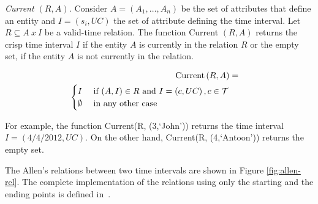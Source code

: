 \begin{definition}
\label{def:current-in-relation}
\emph{Current $\left(R, A \right)$.}
Consider $A=\left(A_1, \ldots, A_n \right)$ be the set of attributes that define an entity and $I = \left(s_i,UC \right)$ the set of attribute defining the time interval. Let $R \subseteq A\  x\  I$ be a valid-time relation. The function Current $\left(R, A \right)$ returns the crisp time interval $I$ if the entity $A$ is currently in the relation $R$ or the empty set, if the entity $A$ is not currently in the relation.


\begin{align}
\label{eq:current-in-relation}
\mbox{Current} \left(R, A \right) &=& \\ 
\begin{cases}
\nonumber
I & \mbox{ if } (A,I) \in R \mbox{ and } I = \left(c, UC \right), c \in \mathcal{T}\\
\emptyset & \mbox{ in any other case }
\end{cases}
\end{align}
\end{definition}

For example, the function Current(R, (3,`John')) returns the time interval $I = \left(4/4/2012 , UC  \right)$. On the other hand, Current(R, (4,`Antoon')) returns the empty set.


The Allen's relations between two time intervals are shown in Figure \ref{fig:allen-rel}. The complete implementation of the relations using only the starting and the ending points is defined in~\cite{Nagypal2003}.


